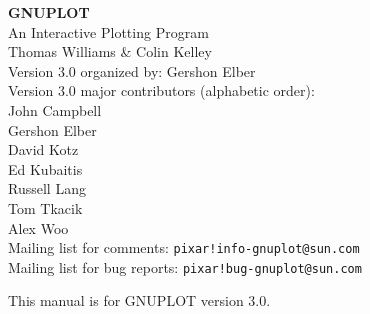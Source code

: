\setlength{\textwidth}{6.25in}
\setlength{\oddsidemargin}{0.5cm}
\setlength{\topmargin}{-0.5in}
\setlength{\textheight}{9in}
\setlength{\parskip}{1ex}
\setlength{\parindent}{0pt}
\adjustarticle


\pagestyle{empty}
   \rule{0in}{3in}
   \begin{center}
   {\huge\bf GNUPLOT}\\
   \vspace{3ex}
   {\Large An Interactive Plotting Program}\\
   \vspace{2ex}
   \large
   Thomas Williams \& Colin Kelley\\
   \vspace{2ex}
   Version 3.0 organized by: Gershon Elber \\
   Version 3.0 major contributors (alphabetic order):\\
  John Campbell\\
  Gershon Elber\\
  David Kotz\\
  Ed Kubaitis\\
  Russell Lang\\
  Tom Tkacik\\
  Alex Woo\\

   \vspace{3ex}
   Mailing list for comments: \verb+pixar!info-gnuplot@sun.com+\\
   Mailing list for bug reports: \verb+pixar!bug-gnuplot@sun.com+

   \vfill
   {\small This manual is for GNUPLOT version 3.0.}

   \end{center}
\newpage

\tableofcontents
\newpage

\setcounter{page}{1}
\pagestyle{myheadings}
